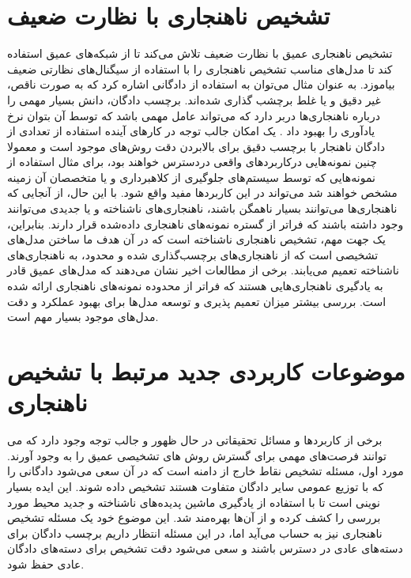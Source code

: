 \documentclass[12pt,a4paper]{report}
\begin{document}
\section{تشخیص ناهنجاری با نظارت ضعیف}
تشخیص ناهنجاری عمیق با نظارت ضعیف\cite{tian2021weakly, https://doi.org/10.48550/arxiv.1910.13601} تلاش می‌کند تا از شبکه‌های عمیق استفاده کند تا مدل‌های مناسب تشخیص ناهنجاری را با استفاده از سیگنال‌های نظارتی ضعیف بیاموزد. به عنوان مثال می‌توان به استفاده از دادگانی اشاره کرد که به صورت ناقص، غیر دقیق و یا غلط برچشب گذاری شده‌اند. برچسب دادگان، دانش بسیار مهمی را درباره ناهنجاری‌ها دربر دارد که می‌تواند عامل مهمی باشد که توسط آن بتوان نرخ‌ یادآوری را بهبود داد \cite{0e1339c0e4924d93b1695af2f9e3e03c, https://doi.org/10.48550/arxiv.1910.13601, tian2021weakly, Sultani_2018_CVPR}. یک امکان جالب توجه در کار‌های آینده استفاده از تعدادی از دادگان ناهنجار با برچسب دقیق برای بالابردن دقت روش‌های موجود است و معمولا چنین نمونه‌هایی درکاربرد‌های واقعی دردسترس خواهند بود، برای مثال استفاده از نمونه‌هایی که توسط سیستم‌های جلوگیری از کلاهبرداری و یا متخصصان آن زمینه مشخص خواهند شد می‌تواند در این کاربرد‌ها مفید واقع شود. با این حال، از آنجایی که ناهنجاری‌ها می‌توانند بسیار ناهمگن باشند، ناهنجاری‌های ناشناخته و یا جدیدی می‌توانند وجود داشته باشند که فراتر از گستره نمونه‌های ناهنجاری داده‌شده قرار دارند. بنابراین، یک جهت مهم، تشخیص ناهنجاری ناشناخته است که در آن هدف ما ساختن مدل‌های تشخیصی است که از ناهنجاری‌های برچسب‌گذاری شده و محدود، به ناهنجاری‌های ناشناخته تعمیم می‌یابند. برخی از مطالعات اخیر\cite{Pang_2021, https://doi.org/10.48550/arxiv.1910.13601, pang2019deep, https://doi.org/10.48550/arxiv.1906.02694} نشان می‌دهند که مدل‌های عمیق قادر به یادگیری ناهنجاری‌هایی هستند که فراتر از محدوده نمونه‌های ناهنجاری ارائه شده است. بررسی بیشتر میزان تعمیم پذیری و توسعه مدل‌ها برای بهبود عملکرد و دقت مدل‌های موجود بسیار مهم است.

\section{موضوعات کاربردی جدید مرتبط با تشخیص ناهنجاری}
برخی از کاربرد‌ها و مسائل تحقیقاتی در حال ظهور و جالب توجه وجود دارد که می توانند فرصت‌های مهمی برای گسترش روش های تشخیصی عمیق  را به وجود آورند. مورد اول، مسئله تشخیص نقاط خارج از دامنه است که در آن سعی می‌شود دادگانی را که با توزیع عمومی سایر دادگان متفاوت هستند تشخیص داده شوند\cite{https://doi.org/10.48550/arxiv.1610.02136, NEURIPS2018_abdeb6f5, https://doi.org/10.48550/arxiv.1906.02845}. این ایده بسیار نوینی است تا با استفاده از یادگیری ماشین پدیده‌های ناشناخته و جدید محیط مورد بررسی را کشف کرده و از آن‌ها بهره‌مند شد. این موضوع خود یک مسئله تشخیص ناهنجاری نیز به حساب می‌آید اما، در این مسئله انتظار داریم برچسب دادگان برای دسته‌های عادی در دسترس باشند و سعی می‌شود دقت تشخیص برای دسته‌های دادگان عادی حفظ شود. \\
\end{document}
